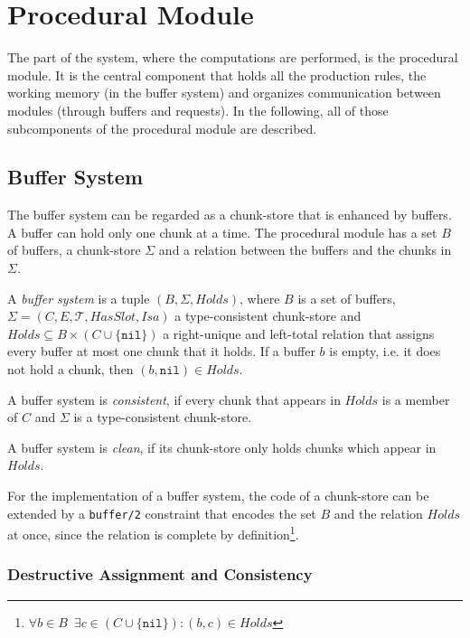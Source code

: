 \section{Procedural Module}
\label{implementation:procedural_module}

The part of the system, where the computations are performed, is the procedural module. It is the central component that holds all the production rules, the working memory (in the buffer system) and organizes communication between modules (through buffers and requests). In the following, all of those subcomponents of the procedural module are described.

\subsection{Buffer System}
\label{implementation:buffer_system}

The buffer system can be regarded as a chunk-store that is enhanced by buffers. A buffer can hold only one chunk at a time. The procedural module has a set $B$ of buffers, a chunk-store $\Sigma$ and a relation between the buffers and the chunks in $\Sigma$.

\begin{definition}
\label{def:buffer_system}
A \emph{buffer system} is a tuple $(B,\Sigma,Holds)$, where $B$ is a set of buffers, $\Sigma = (C, E, \mathcal{T}, HasSlot, Isa)$ a type-consistent chunk-store and $Holds \subseteq B \times (C \cup \{ \mathtt{nil} \})$ a right-unique and left-total relation that assigns every buffer at most one chunk that it holds. If a buffer $b$ is empty, i.e. it does not hold a chunk, then $(b,\mathtt{nil}) \in Holds$.

A buffer system is \emph{consistent}, if every chunk that appears in $Holds$ is a member of $C$ and $\Sigma$ is a type-consistent chunk-store.

A buffer system is \emph{clean}, if its chunk-store only holds chunks which appear in $Holds$.
\end{definition}

For the implementation of a buffer system, the code of a chunk-store can be extended by a \lstinline|buffer/2| constraint that encodes the set $B$ and the relation $Holds$ at once, since the relation is complete by definition\footnote{$\forall b \in B \enspace \exists c \in (C \cup \{ \mathtt{nil} \}): (b,c) \in Holds$}.

\subsubsection{Destructive Assignment and Consistency}
\label{destructive_assignment}

